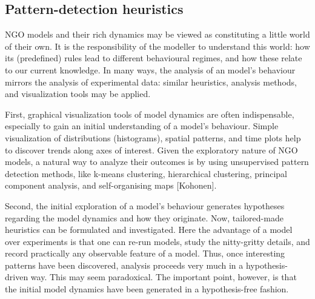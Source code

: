 \subsection{Pattern-detection heuristics}

NGO models and their rich dynamics may be viewed as constituting a little world of their own. It is the responsibility of the modeller to understand this world: how its (predefined) rules lead to different behavioural regimes, and how these relate to our current knowledge. In many ways, the analysis of an model's behaviour mirrors the analysis of experimental data: similar heuristics, analysis methods, and visualization tools may be applied.

First, graphical visualization tools of model dynamics are often indispensable, especially to gain an initial understanding of a model's behaviour. Simple visualization of distributions (histograms), spatial patterns, and time plots help to discover trends along axes of interest. Given the exploratory nature of NGO models, a natural way to analyze their outcomes is by using unsupervised pattern detection methods, like k-means clustering, hierarchical clustering, principal component analysis, and self-organising maps [Kohonen].

Second, the initial exploration of a model's behaviour generates hypotheses regarding the model dynamics and how they originate. Now, tailored-made heuristics can be formulated and investigated. Here the advantage of a model over experiments is that one can re-run models, study the nitty-gritty details, and record practically any observable feature of a model. Thus, once interesting patterns have been discovered, analysis proceeds very much in a hypothesis-driven way. This may seem paradoxical. The important point, however, is that the initial model dynamics have been generated in a hypothesis-free fashion.
